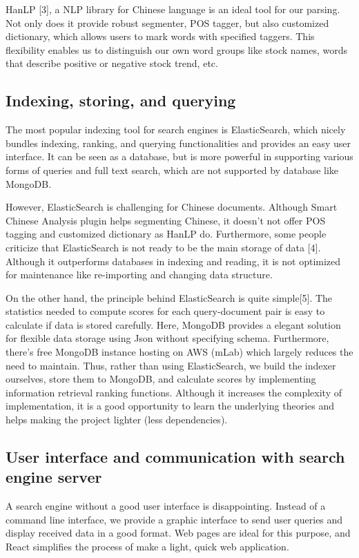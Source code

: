 \documentclass{article}
\begin{document}
HanLP [3], a NLP library for Chinese language is an ideal tool for our parsing. Not only does it provide robust segmenter, POS tagger, but also customized dictionary, which allows users to mark words with specified taggers. This flexibility enables us to distinguish our own word groups like stock names, words that describe positive or negative stock trend, etc.

\subsection{Indexing, storing, and querying}
The most popular indexing tool for search engines is ElasticSearch, which nicely bundles indexing, ranking, and querying functionalities and provides an easy user interface. It can be seen as a database, but is more powerful in supporting various forms of queries and full text search, which are not supported by database like MongoDB. 

However, ElasticSearch is challenging for Chinese documents. Although Smart Chinese Analysis plugin helps segmenting Chinese, it doesn't not offer POS tagging and customized dictionary as HanLP do. Furthermore, some people criticize that ElasticSearch is not ready to be the main storage of data [4]. Although it outperforms databases in indexing and reading, it is not optimized for maintenance like re-importing and changing data structure.

On the other hand, the principle behind ElasticSearch is quite simple[5]. The statistics needed to compute scores for each query-document pair is easy to calculate if data is stored carefully. Here, MongoDB provides a elegant solution for flexible data storage using Json without specifying schema. Furthermore, there's free MongoDB instance hosting on AWS (mLab) which largely reduces the need to maintain. Thus, rather than using ElasticSearch, we build the indexer ourselves, store them to MongoDB, and calculate scores by implementing information retrieval ranking functions. Although it increases the complexity of implementation, it is a good opportunity to learn the underlying theories and helps making the project lighter (less dependencies).

\subsection{User interface and communication with search engine server}
A search engine without a good user interface is disappointing. Instead of a command line interface, we provide a graphic interface to send user queries and display received data in a good format. Web pages are ideal for this purpose, and React simplifies the process of make a light, quick web application. 
\end{document}
